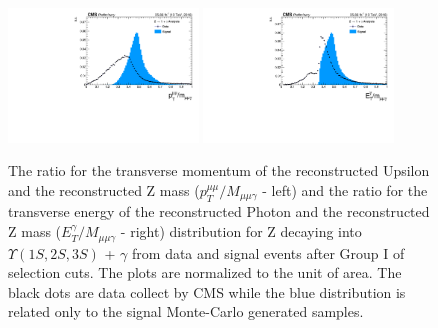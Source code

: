 \begin{figure}[!htbp]
\begin{center}
\includegraphics[width=0.45\textwidth]{figures_and_tables/outputPlots/ZtoUpsilon_Cat0_ZZZZZ/au/data_x_mc/noKinCuts/h_noKin_upsilonPt_over_zMass}\hspace*{1.cm}
\includegraphics[width=0.45\textwidth]{figures_and_tables/outputPlots/ZtoUpsilon_Cat0_ZZZZZ/au/data_x_mc/noKinCuts/h_noKin_photonPt_over_zMass}
\end{center}\vspace*{-.5cm}
\caption{The ratio for the transverse momentum of the reconstructed Upsilon and the reconstructed Z mass ($p_{T}^{\mu\mu}/M_{\mu\mu\gamma}$ - left) and the ratio for the transverse energy of the reconstructed Photon and the reconstructed Z mass ($E_{T}^{\gamma}/M_{\mu\mu\gamma}$ - right) distribution for Z decaying into $\Upsilon(1S,2S,3S)$ + $\gamma$ from data and signal events after Group I of selection cuts. The plots are normalized to the unit of area. The black dots are data collect by CMS while the blue distribution is related only to the signal Monte-Carlo generated samples.}
\label{fig:energy_ration_ZtoUpsilon_Cat0}
\end{figure}

